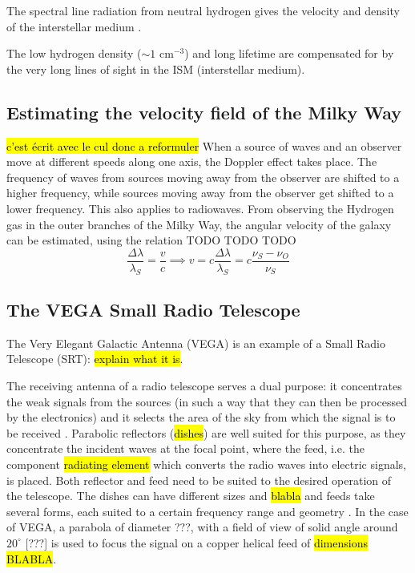 The spectral line radiation from neutral hydrogen gives the velocity and density of the interstellar medium \cite{burke_introduction_2013}.

The low hydrogen density ($\sim 1$ cm$^{-3}$) and long lifetime are compensated for by the very long lines of sight in the ISM (interstellar medium)\cite{burke_introduction_2013}.

\subsection{Estimating the velocity field of the Milky Way}
\hl{c'est écrit avec le cul donc a reformuler}
When a source of waves and an observer move at different speeds along one axis, the Doppler effect takes place. The frequency of waves from sources moving away from the observer are shifted to a higher frequency, while sources moving away from the observer get shifted to a lower frequency. This also applies to radiowaves.
From observing the Hydrogen gas in the outer branches of the Milky Way, the angular velocity of the galaxy can be estimated, using the relation TODO TODO TODO
\begin{equation}
    \frac{\Delta \lambda}{\lambda_S} = \frac{v}{c} \implies v = c \frac{\Delta \lambda}{\lambda_S} = c \frac{\nu_S - \nu_O}{\nu_S}
\end{equation}

\subsection{The VEGA Small Radio Telescope}
The Very Elegant Galactic Antenna (VEGA) is an example of a Small Radio Telescope (SRT): \hl{explain what it is}.

The receiving antenna of a radio telescope serves a dual purpose: it concentrates the weak signals from the sources (in such a way that they can then be processed by the electronics) and it selects the area of the sky from which the signal is to be received \cite{lauterbach_radio_2022}.
Parabolic reflectors (\hl{dishes}) are well suited for this purpose, as they concentrate the incident waves at the focal point, where the feed, i.e. the component \hl{radiating element} which converts the radio waves into electric signals, is placed\footnotemark.
Both reflector and feed need to be suited to the desired operation of the telescope.
The dishes can have different sizes and \hl{blabla} and
feeds take several forms, each suited to a certain frequency range and geometry \cite{lauterbach_radio_2022}. 
In the case of VEGA, a parabola of diameter ???, with a field of view of solid angle around $20^{\circ}$ [???] is used to focus the signal on a copper helical feed of \hl{dimensions BLABLA}.

